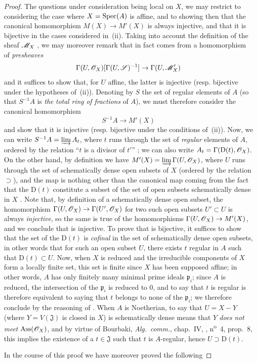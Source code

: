 \begin{proof}
The questions under consideration being local on $X$, we may restrict to considering the case where $X=\operatorname{Spec}(A)$ is affine, and to showing then that the canonical homomorphism $M(X)\to M'(X)$ is always injective, and that it is bijective in the cases considered in~(ii).
Taking into account the definition of the sheaf $\mathscr{M}_X$ , we may moreover remark that  in fact comes from a homomorphism of \emph{presheaves}
\[
  \Gamma(U,\mathscr{O}_X)[\Gamma(U,\mathscr{S})^{-1}]\to\Gamma(U,\mathscr{M}'_X)
\]
and it suffices to show that, for $U$ affine, the latter is injective (resp. bijective under the hypotheses of~(ii)).
Denoting by $S$ the set of regular elements of $A$ (so that $S^{-1}A$ is \emph{the total ring of fractions} of $A$), we must therefore consider the canonical homomorphism
\[
\label{IV.20.2.11.1}
  S^{-1}A\to M'(X)
  \tag{20.2.11.1}
\]
and show that it is injective (resp. bijective under the conditions of~(ii)).
Now, we can write $S^{-1}A=\varinjlim A_t$, where $t$ runs through the set of \emph{regular} elements of $A$, ordered by the relation ``$t$ is a divisor of $t'$'' ; we can also write $A_t=\Gamma(\mathrm{D}(t),\mathscr{O}_X)$.
On the other hand, by definition we have $M'(X)=\varinjlim\Gamma(U,\mathscr{O}_X)$, where $U$ runs through the set of schematically dense open subsets of $X$ (ordered by the relation $\supset$), and the map  is nothing other than the canonical map coming from the fact that the $\mathrm{D}(t)$ constitute a subset of the set of open subsets schematically dense in $X$ .
Note that, by definition of a schematically dense open subset, the homomorphism $\Gamma(U,\mathscr{O}_X)\to\Gamma(U',\mathscr{O}_X)$ for two such open subsets $U'\subset U$ is always \emph{injective}, so the same is true of the homomorphisms $\Gamma(U,\mathscr{O}_X)\to M'(X)$, and we conclude that  is injective.
To prove that  is bijective, it suffices to show that the set of the $\mathrm{D}(t)$ is \emph{cofinal} in the set of schematically dense open subsets, in other words that for such an open subset $U$, there exists $t$ regular in $A$ such that $\mathrm{D}(t)\subset U$.
Now, when $X$ is reduced and the irreducible components of $X$ form a locally finite set, this set is finite since $X$ has been supposed affine; in other words, $A$ has only finitely many minimal prime ideals $\mathfrak{p}_i$; since $A$ is reduced, the intersection of the $\mathfrak{p}_i$ is reduced to $0$, and to say that $t$ is regular is therefore equivalent to saying that $t$ belongs to none of the $\mathfrak{p}_i$; we therefore conclude by the reasoning of .
When $A$ is Noetherian, to say that $U=X-Y$ (where $Y=V(\mathfrak{J})$ is closed in $X$) is schematically dense means  that $Y$ \emph{does not meet} $\operatorname{Ass}(\mathscr{O}_X)$, and by virtue of Bourbaki, \emph{Alg.~comm.}, chap.~IV, , n\textsuperscript{o}~4, prop.~8, this implies the existence of a $t\in\mathfrak{J}$ such that $t$ is $A$-regular, hence $U\supset\mathrm{D}(t)$.

In the course of this proof we have moreover proved the following
\end{proof}


